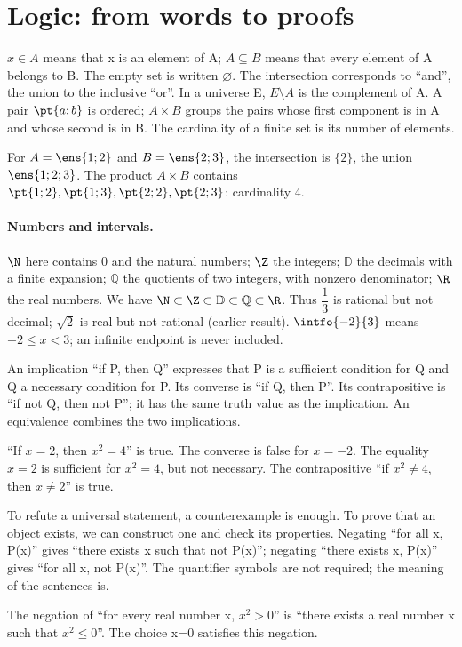 \label{TRANS}
\section{Logic: from words to proofs}\label{LOGIQUE}
\begin{keypoint}
$x\in A$ means that x is an element of A; $A\subseteq B$ means that every element of A belongs to B. The empty set is written $\varnothing$. The intersection corresponds to ``and'', the union to the inclusive ``or''. In a universe E, $E\setminus A$ is the complement of A. A pair $\pt{a;b}$ is ordered; $A\times B$ groups the pairs whose first component is in A and whose second is in B. The cardinality of a finite set is its number of elements.
\end{keypoint}
\begin{example}For $A=\ens{1;2}$ and $B=\ens{2;3}$, the intersection is $\{2\}$, the union $\ens{1;2;3}$. The product $A\times B$ contains $\pt{1;2},\pt{1;3},\pt{2;2},\pt{2;3}$: cardinality 4.\end{example}

\paragraph{Numbers and intervals.} $\N$ here contains 0 and the natural numbers; $\Z$ the integers; $\mathbb D$ the decimals with a finite expansion; $\mathbb Q$ the quotients of two integers, with nonzero denominator; $\R$ the real numbers. We have $\N\subset\Z\subset\mathbb D\subset\mathbb Q\subset\R$. Thus $\dfrac{1}{3}$ is rational but not decimal; $\sqrt2$ is real but not rational (earlier result). $\intfo{-2}{3}$ means $-2\leq x<3$; an infinite endpoint is never included.

An implication ``if P, then Q'' expresses that P is a sufficient condition for Q and Q a necessary condition for P. Its converse is ``if Q, then P''. Its contrapositive is ``if not Q, then not P''; it has the same truth value as the implication. An equivalence combines the two implications.
\begin{example}``If $x=2$, then $x^2=4$'' is true. The converse is false for $x=-2$. The equality $x=2$ is sufficient for $x^2=4$, but not necessary. The contrapositive ``if $x^2\ne4$, then $x\ne2$'' is true.\end{example}

To refute a universal statement, a counterexample is enough. To prove that an object exists, we can construct one and check its properties. Negating ``for all x, P(x)'' gives ``there exists x such that not P(x)''; negating ``there exists x, P(x)'' gives ``for all x, not P(x)''. The quantifier symbols are not required; the meaning of the sentences is.
\begin{example}The negation of ``for every real number x, $x^2>0$'' is ``there exists a real number x such that $x^2\leq0$''. The choice x=0 satisfies this negation.\end{example}

